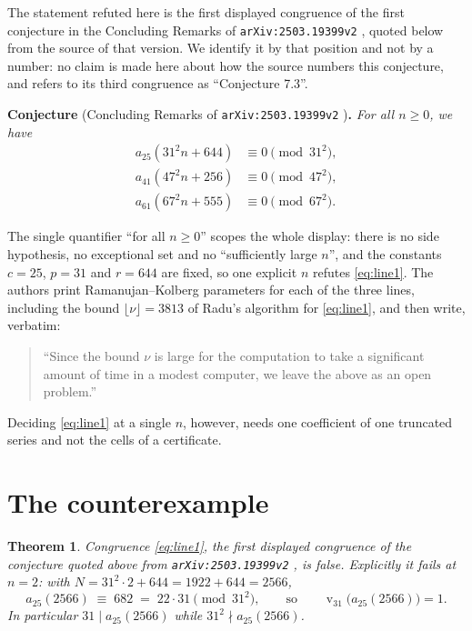 \documentclass[11pt]{amsart}
\newtheorem{theorem}{Theorem}
\theoremstyle{remark}
\DeclareMathOperator{\vv}{v}
\begin{document}
The statement refuted here is the first displayed congruence of the first
conjecture in the Concluding Remarks of \texttt{arXiv:2503.19399v2}
\cite{DasMaitySaikia}, quoted below from the source of that version. We identify
it by that position and not by a number: no claim is made here about how the
source numbers this conjecture, and \cite{GhoshalJana} refers to its third
congruence as ``Conjecture 7.3''.

\medskip
\noindent\textbf{Conjecture} (Concluding Remarks of
\texttt{arXiv:2503.19399v2} \cite{DasMaitySaikia})\textbf{.}
\emph{For all $n\ge0$, we have}
\begin{align}
  a_{25}(31^2n+644)&\equiv0 \pmod{31^2},\label{eq:line1}\\
  a_{41}(47^2n+256)&\equiv0 \pmod{47^2},\label{eq:line2}\\
  a_{61}(67^2n+555)&\equiv0 \pmod{67^2}.\label{eq:line3}
\end{align}

\medskip
\noindent
The single quantifier ``for all $n\ge0$'' scopes the whole display: there is no
side hypothesis, no exceptional set and no ``sufficiently large $n$'', and the
constants $c=25$, $p=31$ and $r=644$ are fixed, so one explicit $n$ refutes
\eqref{eq:line1}. The authors print Ramanujan--Kolberg parameters for each of
the three lines, including the bound $\lfloor\nu\rfloor=3813$ of Radu's
algorithm \cite{Radu} for \eqref{eq:line1}, and then write, verbatim:
\begin{quote}
``Since the bound $\nu$ is large for the computation to take a significant
amount of time in a modest computer, we leave the above as an open problem.''
\end{quote}
Deciding \eqref{eq:line1} at a single $n$, however, needs one coefficient of one
truncated series and not the cells of a certificate.

\section{The counterexample}\label{sec:refute}

\begin{theorem}\label{thm:main}
Congruence \eqref{eq:line1}, the first displayed congruence of the conjecture
quoted above from \texttt{arXiv:2503.19399v2} \cite{DasMaitySaikia}, is false.
Explicitly it
fails at $n=2$: with
$N=31^2\cdot2+644=1922+644=2566$,
\[
  a_{25}(2566)\;\equiv\;682\;=\;22\cdot31 \pmod{31^2},
  \qquad\text{so}\qquad \vv_{31}\bigl(a_{25}(2566)\bigr)=1 .
\]
In particular $31\mid a_{25}(2566)$ while $31^2\nmid a_{25}(2566)$.
\end{theorem}
\end{document}
